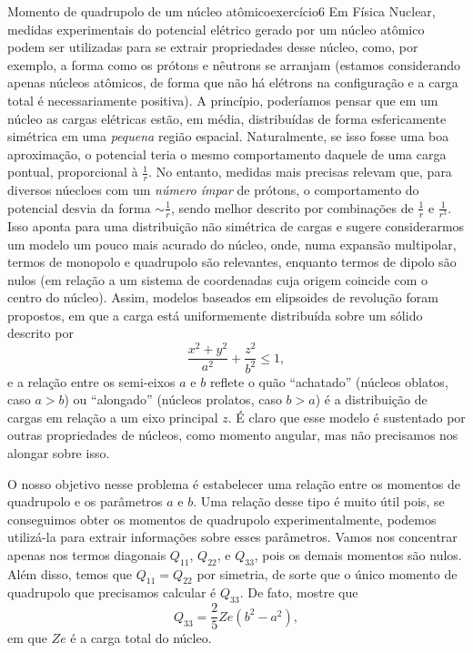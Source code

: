 \begin{exercício}{Momento de quadrupolo de um núcleo atômico}{exercício6}
    Em Física Nuclear, medidas experimentais do potencial elétrico gerado por um núcleo atômico podem ser utilizadas para se extrair propriedades desse núcleo, como, por exemplo, a forma como os prótons e nêutrons se arranjam (estamos considerando apenas núcleos atômicos, de forma que não há elétrons na configuração e a carga total é necessariamente positiva). A princípio, poderíamos pensar que em um núcleo as cargas elétricas estão, em média, distribuídas de forma esfericamente simétrica em uma \emph{pequena} região espacial. Naturalmente, se isso fosse uma boa aproximação, o potencial teria o mesmo comportamento daquele de uma carga pontual, proporcional à \(\frac1r\). No entanto, medidas mais precisas relevam que, para diversos núecloes com um \emph{número ímpar} de prótons, o comportamento do potencial desvia da forma \(\sim\frac1r\), sendo melhor descrito por combinações de \(\frac1r\) e \(\frac1{r^3}\). Isso aponta para uma distribuição não simétrica de cargas e sugere considerarmos um modelo um pouco mais acurado do núcleo, onde, numa expansão multipolar, termos de monopolo e quadrupolo são relevantes, enquanto termos de dipolo são nulos (em relação a um sistema de coordenadas cuja origem coincide com o centro do núcleo). Assim, modelos baseados em elipsoides de revolução foram propostos, em que a carga está uniformemente distribuída sobre um sólido descrito por
    \begin{equation*}
        \frac{x^2 + y^2}{a^2} + \frac{z^2}{b^2} \leq 1,
    \end{equation*}
    e a relação entre os semi-eixos \(a\) e \(b\) reflete o quão \enquote{achatado} (núcleos oblatos, caso \(a > b\)) ou \enquote{alongado} (núcleos prolatos, caso \(b > a\)) é a distribuição de cargas em relação a um eixo principal \(z\). É claro que esse modelo é sustentado por outras propriedades de núcleos, como momento angular, mas não precisamos nos alongar sobre isso.

    O nosso objetivo nesse problema é estabelecer uma relação entre os momentos de quadrupolo e os parâmetros \(a\) e \(b\). Uma relação desse tipo é muito útil pois, se conseguimos obter os momentos de quadrupolo experimentalmente, podemos utilizá-la para extrair informações sobre esses parâmetros. Vamos nos concentrar apenas nos termos diagonais \(Q_{11}\), \(Q_{22}\), e \(Q_{33}\), pois os demais momentos são nulos. Além disso, temos que \(Q_{11} = Q_{22}\) por simetria, de sorte que o único momento de quadrupolo que precisamos calcular é \(Q_{33}\). De fato, mostre que
    \begin{equation*}
        Q_{33} = \frac25 Z e(b^2 - a^2),
    \end{equation*}
    em que \(Ze\) é a carga total do núcleo.
\end{exercício}
